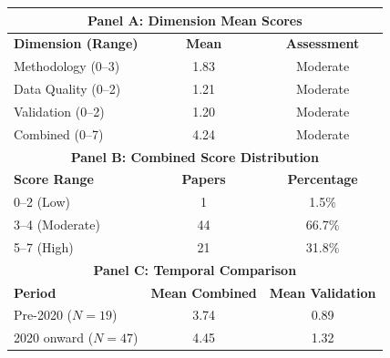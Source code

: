 \documentclass[preview]{standalone}
\begin{document}
\begin{tabular}{|l|c|c|}
\hline
\multicolumn{3}{|c|}{\textbf{Panel A: Dimension Mean Scores}} \\
\hline
\textbf{Dimension (Range)} & \textbf{Mean} & \textbf{Assessment} \\
\hline
Methodology (0--3) & 1.83 & Moderate \\
Data Quality (0--2) & 1.21 & Moderate \\
Validation (0--2) & 1.20 & Moderate \\
Combined (0--7) & 4.24 & Moderate \\
\hline
\multicolumn{3}{|c|}{\textbf{Panel B: Combined Score Distribution}} \\
\hline
\textbf{Score Range} & \textbf{Papers} & \textbf{Percentage} \\
\hline
0--2 (Low) & 1 & 1.5\% \\
3--4 (Moderate) & 44 & 66.7\% \\
5--7 (High) & 21 & 31.8\% \\
\hline
\multicolumn{3}{|c|}{\textbf{Panel C: Temporal Comparison}} \\
\hline
\textbf{Period} & \textbf{Mean Combined} & \textbf{Mean Validation} \\
\hline
Pre-2020 ($N=19$) & 3.74 & 0.89 \\
2020 onward ($N=47$) & 4.45 & 1.32 \\
\hline
\end{tabular}
\end{document}
